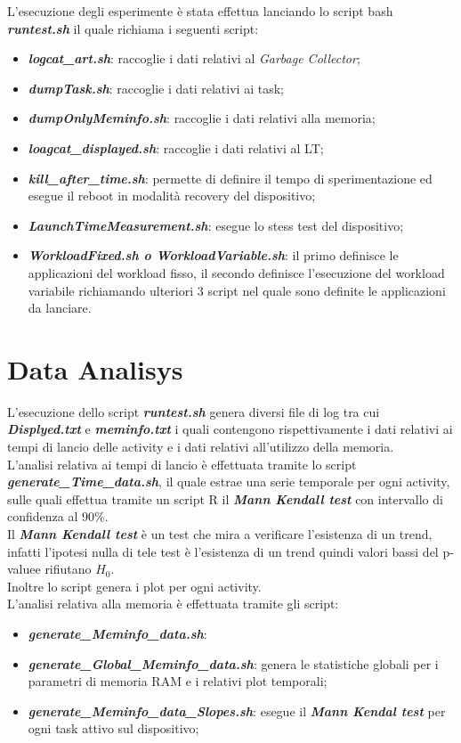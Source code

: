 L'esecuzione degli esperimente è stata effettua lanciando lo script bash
\textit{\textbf{runtest.sh}} il quale richiama i seguenti script:
  \begin{itemize}
    \item \textit{\textbf{logcat\_art.sh}}: raccoglie i dati relativi al \textit{Garbage Collector};
    \item \textit{\textbf{dumpTask.sh}}: raccoglie i dati relativi ai task;
    \item \textit{\textbf{dumpOnlyMeminfo.sh}}: raccoglie i dati relativi alla memoria;
    \item \textit{\textbf{loagcat\_displayed.sh}}: raccoglie i dati relativi al LT;
    \item \textit{\textbf{kill\_after\_time.sh}}: permette di definire il tempo di
    sperimentazione ed esegue il reboot in modalità recovery del dispositivo;
    \item \textit{\textbf{LaunchTimeMeasurement.sh}}: esegue lo stess test del dispositivo;
    \item \textit{\textbf{WorkloadFixed.sh o WorkloadVariable.sh}}: il primo definisce le applicazioni del
    workload fisso, il secondo definisce l'esecuzione del workload variabile richiamando
    ulteriori 3 script nel quale sono definite le applicazioni da lanciare.
  \end{itemize}

\section{Data Analisys}

L'esecuzione dello script \textbf{\textit{runtest.sh}} genera diversi file di log
tra cui \textit{\textbf{Displyed.txt}} e \textit{\textbf{meminfo.txt}} i quali
contengono rispettivamente i dati relativi ai tempi di lancio delle activity e
i dati relativi all'utilizzo della memoria.\\
L'analisi relativa ai tempi di lancio è effettuata tramite lo script \textbf{\textit{generate\_Time\_data.sh}},
il quale estrae una serie temporale per ogni activity, sulle quali effettua
tramite un script R il \textbf{\textit{Mann Kendall test}} con intervallo
di confidenza al 90\%.\\
Il \textbf{\textit{Mann Kendall test}} è un test che mira a verificare l'esistenza
di un trend, infatti l'ipotesi nulla di tele test è l'esistenza di un trend quindi
valori bassi del p-valuee rifiutano $H_0$.\\
Inoltre lo script genera i plot per ogni activity.\\
L'analisi relativa alla memoria è effettuata tramite gli script:
\begin{itemize}
  \item \textit{\textbf{generate\_Meminfo\_data.sh}}:
  \item \textit{\textbf{generate\_Global\_Meminfo\_data.sh}}: genera le statistiche
  globali per i parametri di memoria RAM e i relativi plot temporali;
  \item \textit{\textbf{generate\_Meminfo\_data\_Slopes.sh}}: esegue il \textbf{\textit{Mann Kendal test}}
  per ogni task attivo sul dispositivo;
\end{itemize}

